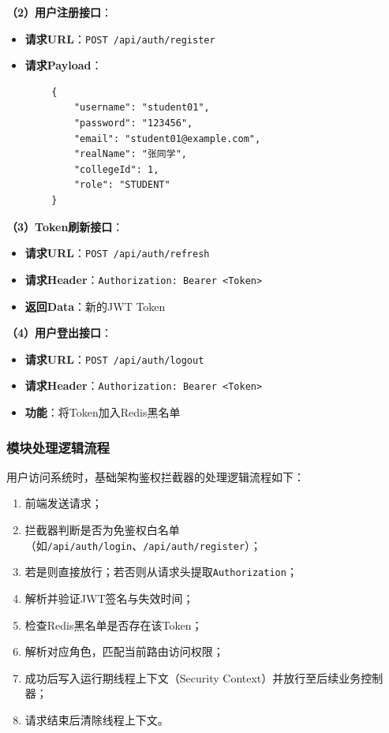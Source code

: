 \documentclass{../template/softeng}
\begin{document}
	\textbf{（2）用户注册接口}：
	\begin{itemize}
		\item \textbf{请求URL}：\texttt{POST /api/auth/register}
		\item \textbf{请求Payload}：
	\end{itemize}
	\begin{verbatim}
		{
			"username": "student01",
			"password": "123456",
			"email": "student01@example.com",
			"realName": "张同学",
			"collegeId": 1,
			"role": "STUDENT"
		}
	\end{verbatim}

	\textbf{（3）Token刷新接口}：
	\begin{itemize}
		\item \textbf{请求URL}：\texttt{POST /api/auth/refresh}
		\item \textbf{请求Header}：\texttt{Authorization: Bearer <Token>}
		\item \textbf{返回Data}：新的JWT Token
	\end{itemize}

	\textbf{（4）用户登出接口}：
	\begin{itemize}
		\item \textbf{请求URL}：\texttt{POST /api/auth/logout}
		\item \textbf{请求Header}：\texttt{Authorization: Bearer <Token>}
		\item \textbf{功能}：将Token加入Redis黑名单
	\end{itemize}

	\subsubsection{模块处理逻辑流程}
	用户访问系统时，基础架构鉴权拦截器的处理逻辑流程如下：
	\begin{enumerate}
		\item 前端发送请求；
		\item 拦截器判断是否为免鉴权白名单（如\texttt{/api/auth/login}、\texttt{/api/auth/register}）；
		\item 若是则直接放行；若否则从请求头提取\texttt{Authorization}；
		\item 解析并验证JWT签名与失效时间；
		\item 检查Redis黑名单是否存在该Token；
		\item 解析对应角色，匹配当前路由访问权限；
		\item 成功后写入运行期线程上下文（Security Context）并放行至后续业务控制器；
		\item 请求结束后清除线程上下文。
	\end{enumerate}
\end{document}
